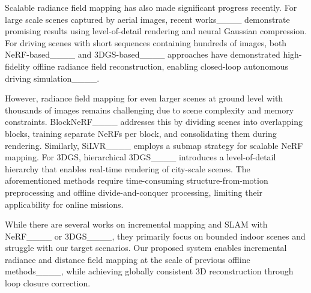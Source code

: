 Scalable radiance field mapping has also made significant progress recently.
%
For large scale scenes captured by aerial images, recent works____ demonstrate promising results using level-of-detail rendering and neural Gaussian compression.
%
For driving scenes with short sequences containing hundreds of images, both NeRF-based____ and 3DGS-based____ approaches have demonstrated high-fidelity offline radiance field reconstruction, enabling closed-loop autonomous driving simulation____.
%

%
However, radiance field mapping for even larger scenes at ground level with thousands of images remains challenging due to scene complexity and memory constraints.
%
\mbox{BlockNeRF}____ addresses this by dividing scenes into overlapping blocks, training separate NeRFs per block, and consolidating them during rendering. 
%
Similarly, SiLVR____ employs a submap strategy for scalable NeRF mapping.
%
For 3DGS, hierarchical 3DGS____ introduces a level-of-detail hierarchy that enables real-time rendering of city-scale scenes. 
%
The aforementioned methods require time-consuming structure-from-motion preprocessing and offline divide-and-conquer processing, limiting their applicability for online missions. 
%

While there are several works on incremental mapping and SLAM with NeRF____ or 3DGS____, they primarily focus on bounded indoor scenes and struggle with our target scenarios.
%
Our proposed system enables incremental radiance and distance field mapping at the scale of previous offline methods____, while achieving globally consistent 3D reconstruction through loop closure correction.
%







